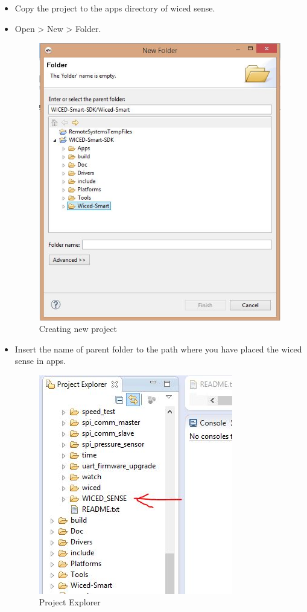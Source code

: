 \documentclass[11pt,a4paper]{article}
\begin{document}
  \begin{itemize}
 \item Copy the project to the apps directory of wiced sense.
 \item Open > New > Folder.
 \begin{figure}[h]
    \centering
	\includegraphics[scale=0.37]{newproj.JPG}
	\caption{Creating new project}
	\end{figure}
 \item Insert the name of parent folder to the path where you have placed the wiced sense in apps. 

	 \begin{figure}[h]
    \centering
	\includegraphics[scale=0.6]{wiced.JPG} 
	\caption{Project Explorer}
	\end{figure}
	

\end{itemize}
\end{document}
